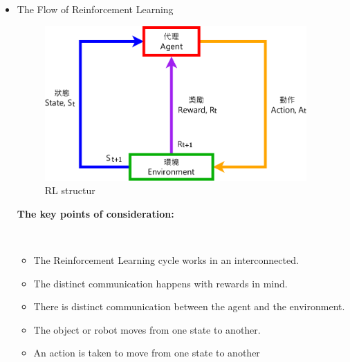 \documentclass[14pt,a4paper]{report}  %
\begin{document}
\begin{itemize}
\item The Flow of Reinforcement Learning\\
\begin{figure}[hbt!]
\begin{center}
\includegraphics[width=10cm]{The_Flow_of_Reinforcement_Learning}
\caption{RL structur}
\end{center}
\end{figure}
\begin{large}
\textbf{The key points of consideration:}
\end{large}\\
\begin{itemize}
\item The Reinforcement Learning cycle works in an interconnected. 
\end{itemize}

\begin{itemize}
\item The distinct communication happens with rewards in mind.
\end{itemize}
\begin{itemize}
\item There is distinct communication between the agent and the 
environment. 
 
\end{itemize}
\begin{itemize}
\item The object or robot moves from one state to another. 
 
\end{itemize}
\begin{itemize}
\item An action is taken to move from one state to another 
\end{itemize}


\end{itemize}
\end{document}
